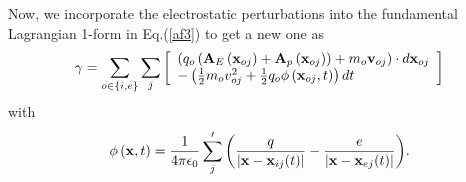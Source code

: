 \documentclass[12pt]{iopart}
\begin{document}
Now, we incorporate the electrostatic perturbations into the fundamental Lagrangian 1-form in Eq.(\ref{af3}) to get a new one as
\begin{equation}\label{af52}
\gamma  = \sum\limits_{o \in \{ i,e\} } {\sum\limits_j {\left[ \begin{array}{l}
\left( {{q_o}\left( {{{\bf{A}}_E}\left( {{{\bf{x}}_{oj}}} \right) + {{\bf{A}}_p}\left( {{{\bf{x}}_{oj}}} \right)} \right) + {m_o}{{\bf{v}}_{oj}}} \right)\cdot d{{\bf{x}}_{oj}}\\
 - \left( {\frac{1}{2}{m_o}v_{oj}^2 + \frac{1}{2}{q_o}\phi \left( {{{\bf{x}}_{oj}},t} \right)} \right)dt
\end{array} \right]} }
\end{equation}
with
\begin{equation}\label{af53}
\phi \left( {\bf{x}},t \right) = \frac{1}{{4\pi {\epsilon_0}}}\sum'\limits_{j} {\left( {\frac{q}{{|{{\bf{x}}} - {{\bf{x}}_{ij}}(t)|}} - \frac{e}{{|{{\bf{x}}} - {{\bf{x}}_{ej}}(t)|}}} \right)}.
\end{equation}
\end{document}
